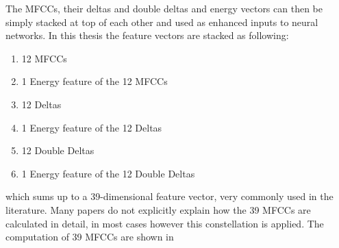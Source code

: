 The MFCCs, their deltas and double deltas and energy vectors can then be simply stacked at top of each other and used as enhanced inputs to neural networks.
In this thesis the feature vectors are stacked as following:
\begin{enumerate}
    \item 12 MFCCs
    \item 1 Energy feature of the 12 MFCCs
    \item 12 Deltas
    \item 1 Energy feature of the 12 Deltas
    \item 12 Double Deltas
    \item 1 Energy feature of the 12 Double Deltas
\end{enumerate}
which sums up to a 39-dimensional feature vector, very commonly used in the literature.
Many papers do not explicitly explain how the 39 MFCCs are calculated in detail, in most cases however this constellation is applied.
The computation of 39 MFCCs are shown in 
